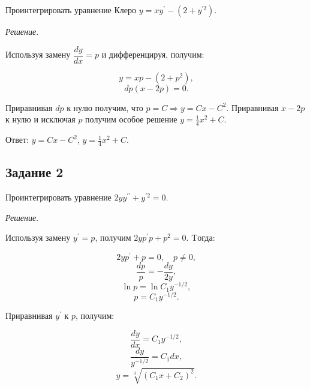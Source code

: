 \documentclass[11pt, a4paper]{article}
\begin{document}
	Проинтегрировать уравнение Клеро $y = xy^\prime - (2 + y^{\prime 2})$.
	
	\vspace{0.2cm}
	\par
	\textit{Решение}. 
	
	\par
	Используя замену $\dfrac{dy}{dx} = p$ и дифференцируя, получим:
	
	\begin{equation*}
		y = xp - (2 + p^2),
	\end{equation*}
	\begin{equation*}
		dp(x - 2p) = 0.
	\end{equation*}
	
	\par
	Приравнивая $dp$ к нулю получим, что $p = C \Rightarrow y = Cx - C^2$. Приравнивая $x - 2p$ к нулю и исключая $p$ получим особое решение $y = \frac{1}{4} x^2 + C$.
	
	\par\noindent	
	Ответ: $y = Cx - C^2$, $y = \frac{1}{4} x^2 + C$.

	
	\subsection*{Задание 2}
	
	Проинтегрировать уравнение $2yy^{\prime\prime} + y^{\prime 2} = 0$.
	
	\vspace{0.2cm}
	\par
	\textit{Решение}. 
	
	\par
	Используя замену $y^\prime = p$, получим $2yp^\prime p + p^2 = 0$. Tогда:
	
	\begin{equation*}
    	2yp^\prime + p = 0, \quad p \neq 0,
	\end{equation*}
	\begin{equation*}
    	\dfrac{dp}{p} = -\dfrac{dy}{2y},
	\end{equation*}
	\begin{equation*}
    	\ln{p} = \ln{C_1y^{-1/2}},
	\end{equation*}
	\begin{equation*}
    	p = C_1y^{-1/2}.
	\end{equation*}
	
	\par
	Приравнивая $y^\prime$ к $p$, получим:
	
	\begin{equation*}
    	\dfrac{dy}{dx} = C_1y^{-1/2},
	\end{equation*}
	\begin{equation*}
    	\dfrac{dy}{y^{-1/2}} = C_1dx,
	\end{equation*}
	\begin{equation*}
    	y = \sqrt[3]{(C_1x + C_2)^2}.
	\end{equation*}
	
\end{document}
